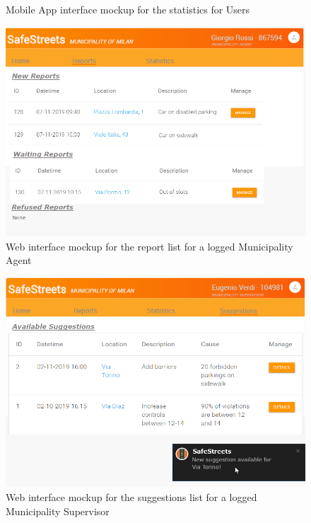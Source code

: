 \documentclass[a4paper]{report}
\begin{document}
{\begin{figure}
\caption[Mobile App mockup for statistics]{Mobile App interface mockup for the statistics for Users}
\label{fig:check-statistics}
\end{figure}
\begin{figure}[htp]
\centering
\includegraphics[width= \textwidth]{../RASD/img/mockups/homeReport.png}
\caption[Web mockup for reports page]{Web interface mockup for the report list for a logged Municipality Agent }
\label{fig:mock-webreports}
\end{figure}
\begin{figure}[htp]
\centering
\includegraphics[width= \textwidth]{../RASD/img/mockups/homeSuggestions.png}
\caption[Web mockup for suggestions page]{Web interface mockup for the suggestions list for a logged Municipality Supervisor}
\label{fig:mock-suggestions}
\end{figure}
}
\end{document}
